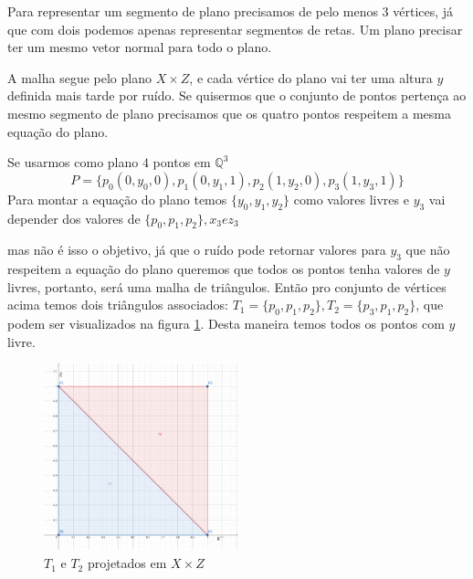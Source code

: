 Para representar um segmento de plano precisamos de pelo menos $3$ vértices, 
já que com dois podemos apenas representar segmentos de retas. Um plano precisar
ter um mesmo vetor normal para todo o plano.

A malha segue pelo plano $X \times Z$, e cada vértice do plano vai ter uma altura
$y$ definida mais tarde por ruído. Se quisermos que o conjunto de pontos pertença
ao mesmo segmento de plano precisamos que os quatro pontos respeitem a mesma
equação do plano.%

Se usarmos como plano $4$ pontos em $\mathbb{Q}^3$
\begin{equation}\label{comp_sign_inter_sem_peso_aux}
    P = \{p_{0}(0, y_{0}, 0), p_{1}(0, y_{1}, 1), p_{2}(1, y_{2}, 0), p_{3}(1, y_{3}, 1)\}
\end{equation}
Para montar a equação do plano temos $\{y_{0}, y_{1}, y_{2}\}$ como valores livres e $y_{3}$
vai depender dos valores de $\{p_{0}, p_{1}, p_{2}\}, x_{3} e z_{3}$


mas não é isso o objetivo, já que o ruído pode retornar valores para $y_{3}$
que não respeitem a equação do plano queremos que todos os pontos tenha valores de $y$
livres, portanto, será uma malha de triângulos. Então pro conjunto de vértices
acima temos dois triângulos associados:
$T_{1} = \{p_{0}, p_{1}, p_{2}\}, T_{2} = \{p_{3}, p_{1}, p_{2}\}$, que podem ser
visualizados na figura \ref{fig:t1t2}. 
Desta maneira temos todos os pontos com $y$ livre.

\begin{figure}[H]
    \centering
    \includegraphics[width=0.5\textwidth]{figuras/t1t2.png}
    \caption{$T_{1}$ e $T_{2}$ projetados em $X \times Z$}
    \label{fig:t1t2}
\end{figure}



